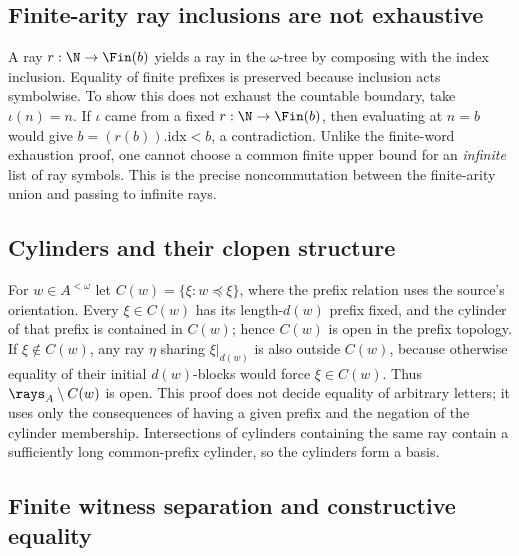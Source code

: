 \subsection{Finite-arity ray inclusions are not exhaustive}\label{supp:10-2}
\par{}\par\smallskip

A ray $r:\N\to\Fin(b)$ yields a ray in the $\omega$-tree by composing with the index inclusion. Equality of finite prefixes is preserved because inclusion acts symbolwise. To show this does not exhaust the countable boundary, take $\iota(n)=n$. If $\iota$ came from a fixed $r:\N\to\Fin(b)$, then evaluating at $n=b$ would give $b=(r(b)).\mathrm{idx}<b$, a contradiction. Unlike the finite-word exhaustion proof, one cannot choose a common finite upper bound for an \emph{infinite} list of ray symbols. This is the precise noncommutation between the finite-arity union and passing to infinite rays.

\subsection{Cylinders and their clopen structure}\label{supp:10-3}
\par{}\par\smallskip

For $w\in A^{<\omega}$ let $C(w)=\{\xi:w\preceq\xi\}$, where the prefix relation uses the source's orientation. Every $\xi\in C(w)$ has its length-$d(w)$ prefix fixed, and the cylinder of that prefix is contained in $C(w)$; hence $C(w)$ is open in the prefix topology. If $\xi\notin C(w)$, any ray $\eta$ sharing $\xi|_{d(w)}$ is also outside $C(w)$, because otherwise equality of their initial $d(w)$-blocks would force $\xi\in C(w)$. Thus $\rays_A\setminus C(w)$ is open. This proof does not decide equality of arbitrary letters; it uses only the consequences of having a given prefix and the negation of the cylinder membership. Intersections of cylinders containing the same ray contain a sufficiently long common-prefix cylinder, so the cylinders form a basis.

\subsection{Finite witness separation and constructive equality}\label{supp:10-4}
\par{}\par\smallskip

